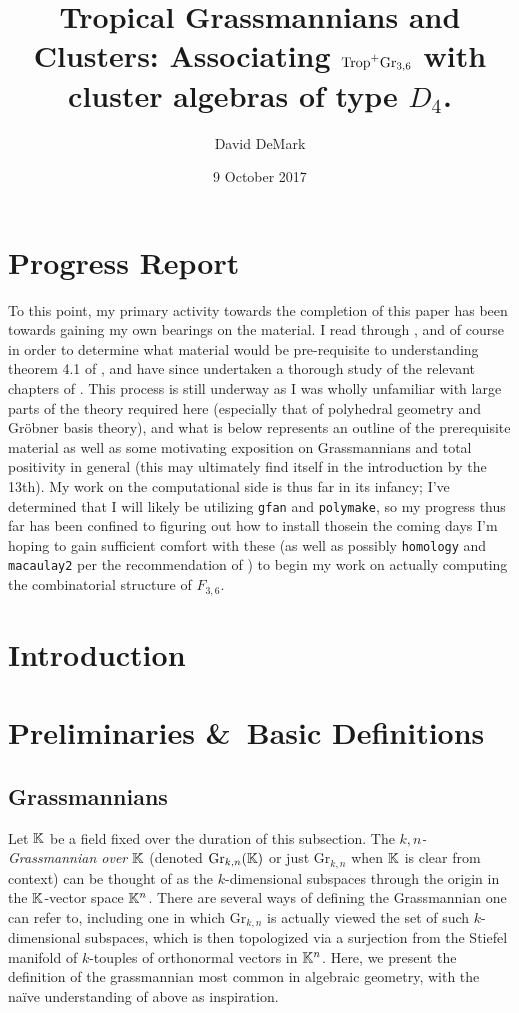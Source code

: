 \documentclass[12pt,letter]{article}
\title{Tropical Grassmannians and Clusters: Associating $\trop^+\gr_{3,6}$ with cluster algebras of type $D_4$.}
\date{9 October 2017}
\author{David DeMark}
\newcommand{\gr}{\mathrm{Gr}}
\begin{document}
\maketitle\setcounter{section}{-2}
\section{Progress Report}
To this point, my primary activity towards the completion of this paper has been towards gaining my own bearings on the material. I read through \cite{WiSp05}, \cite{He09} and of course \cite{BCL16} in order to determine what material would be pre-requisite to understanding theorem 4.1 of \cite{BCL16}, and have since undertaken a thorough study of the relevant chapters of \cite{MaSt15}. This process is still underway as I was wholly unfamiliar with large parts of the theory required here (especially that of polyhedral geometry and Gr\"obner basis theory), and what is below represents an outline of the prerequisite material as well as some motivating exposition on Grassmannians and total positivity in general (this may ultimately find itself in the introduction by the 13th). My work on the computational side is thus far in its infancy; I've determined that I will likely be utilizing \verb|gfan| and \verb|polymake|, so my progress thus far has been confined to figuring out how to install those\textemdash in the coming days I'm hoping to gain sufficient comfort with these (as well as possibly \verb|homology| and \verb|macaulay2| per the recommendation of \cite{He09}) to begin my work on actually computing the combinatorial structure of $F_{3,6}$. 
\section{Introduction}
\section{Preliminaries \&~Basic Definitions}

\subsection{Grassmannians}
Let ${\mathbb K}$ be a field fixed over the duration of this subsection. The \emph{$k,n$-Grassmannian over ${\mathbb K}$} (denoted $\gr_{k,n}(\KK)$ or just $\gr_{k,n}$ when ${\mathbb K}$ is clear from context) can be thought of as the $k$-dimensional subspaces through the origin in the ${\mathbb K}$-vector space ${\mathbb K}^n$. There are several ways of defining the Grassmannian one can refer to, including one \cite[\S1.2]{khat} in which $\gr_{k,n}$ is actually viewed the set of such $k$-dimensional subspaces, which is then topologized via a surjection from the Stiefel manifold of $k$-touples of orthonormal vectors in ${\mathbb K}^n$. Here, we present the definition of the grassmannian most common in algebraic geometry,
with the na\"ive understanding of above as inspiration.
\end{document}
